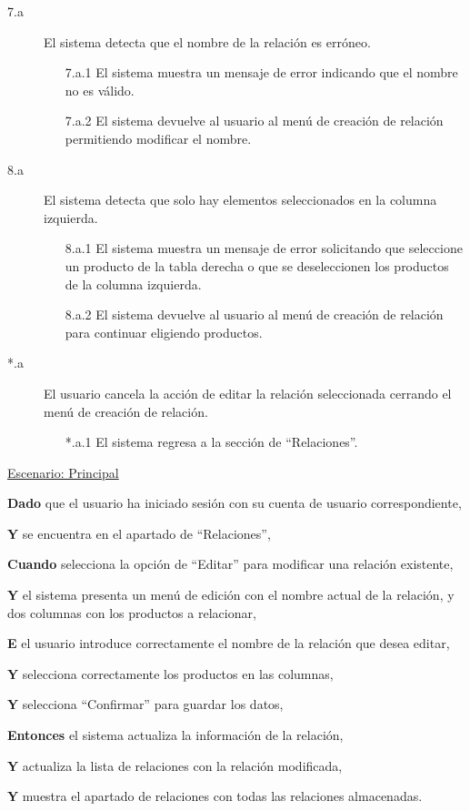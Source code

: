 \begin{description}
    
    \item[7.a] El sistema detecta que el nombre de la relación es erróneo.
    \begin{enumerate}
        \item[7.a.1] El sistema muestra un mensaje de error indicando que el nombre no es válido.
        \item[7.a.2] El sistema devuelve al usuario al menú de creación de relación permitiendo modificar el nombre.
    \end{enumerate}
    
    \item[8.a] El sistema detecta que solo hay elementos seleccionados en la columna izquierda.
    \begin{enumerate}
        \item[8.a.1] El sistema muestra un mensaje de error solicitando que seleccione un producto de la tabla derecha o que se deseleccionen los productos de la columna izquierda.
        \item[8.a.2] El sistema devuelve al usuario al menú de creación de relación para continuar eligiendo productos.
    \end{enumerate}

    \item[*.a] El usuario cancela la acción de editar la relación seleccionada cerrando el menú de creación de relación.
    \begin{enumerate}
        \item[*.a.1] El sistema regresa a la sección de \enquote{Relaciones}.
    \end{enumerate}
\end{description}

\underline{Escenario: Principal}\par
\vspace{0.15cm}
\textbf{Dado} que el usuario ha iniciado sesión con su cuenta de usuario correspondiente,\par
\textbf{Y} se encuentra en el apartado de \enquote{Relaciones},\par
\textbf{Cuando} selecciona la opción de \enquote{Editar} para modificar una relación existente,\par
\textbf{Y} el sistema presenta un menú de edición con el nombre actual de la relación, y dos columnas con los productos a relacionar,\par
\textbf{E} el usuario introduce correctamente el nombre de la relación que desea editar,\par
\textbf{Y} selecciona correctamente los productos en las columnas,\par
\textbf{Y} selecciona \enquote{Confirmar} para guardar los datos,\par
\textbf{Entonces} el sistema actualiza la información de la relación,\par
\textbf{Y} actualiza la lista de relaciones con la relación modificada,\par
\textbf{Y} muestra el apartado de relaciones con todas las relaciones almacenadas.\par

